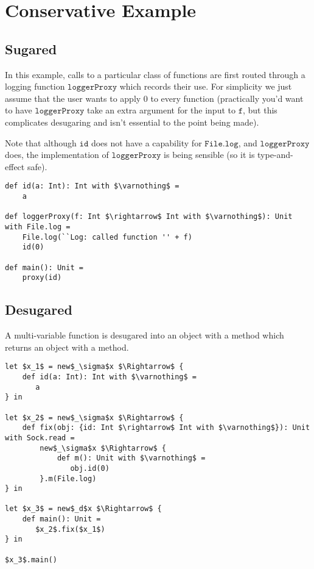 \documentclass{llncs}
\newcommand{\keywadj}[1]{\mathtt{#1}}
\newcommand{\kwa}[1]{\keywadj{ #1 }}
\begin{document}
\section{Conservative Example}

\subsection{Sugared}

In this example, calls to a particular class of functions are first routed through a logging function $\kwa{loggerProxy}$ which records their use. For simplicity we just assume that the user wants to apply $0$ to every function (practically you'd want to have $\kwa{loggerProxy}$ take an extra argument for the input to $\kwa{f}$, but this complicates desugaring and isn't essential to the point being made).

Note that although $\kwa{id}$ does not have a capability for $\kwa{File.log}$, and $\kwa{loggerProxy}$ does, the implementation of $\kwa{loggerProxy}$ is being sensible (so it is type-and-effect safe).

\begin{lstlisting}
def id(a: Int): Int with $\varnothing$ =
    a

def loggerProxy(f: Int $\rightarrow$ Int with $\varnothing$): Unit with File.log =
    File.log(``Log: called function '' + f)
    id(0)
    
def main(): Unit =
	proxy(id)

\end{lstlisting}

\subsection{Desugared}

A multi-variable function is desugared into an object with a method which returns an object with a method.

\begin{lstlisting}
let $x_1$ = new$_\sigma$x $\Rightarrow$ {
    def id(a: Int): Int with $\varnothing$ =
       a
} in

let $x_2$ = new$_\sigma$x $\Rightarrow$ {
    def fix(obj: {id: Int $\rightarrow$ Int with $\varnothing$}): Unit with Sock.read =
        new$_\sigma$x $\Rightarrow$ {
            def m(): Unit with $\varnothing$ =
               obj.id(0)
        }.m(File.log)
} in

let $x_3$ = new$_d$x $\Rightarrow$ {
    def main(): Unit =
       $x_2$.fix($x_1$)
} in

$x_3$.main()

\end{lstlisting}
\end{document}
